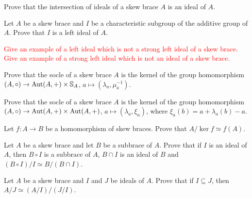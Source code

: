 \begin{prob}
\label{prob:sum_ideals}
Prove that the intersection of ideals of a skew brace $A$ is an ideal of $A$. 
\end{prob}

\begin{prob}
Let $A$ be a skew brace and $I$ be a characteristic subgroup of the additive group of $A$. Prove that
$I$ is a left ideal of $A$. 
\end{prob}


\begin{prob}\label{prob:exleftidealnotstrong}
\textcolor{red}{Give an example of a left ideal which is not a strong left ideal of a skew brace. Give an example of a strong left ideal which is not an ideal of a skew brace.} 
\end{prob}

\begin{prob}
\label{prob:Bachiller1}
Prove that the socle of a skew brace $A$ is the kernel of the 
group homomorphism $(A,\circ)\to\operatorname{Aut}(A,+)\times\mathbb{S}_A$, $a\mapsto (\lambda_a,\mu_a^{-1})$. 
\end{prob}

\begin{prob}
\label{prob:Bachiller2}
Prove that the socle of a skew brace $A$ is the kernel of the 
group homomorphism $(A,\circ)\to\operatorname{Aut}(A,+)\times\operatorname{Aut}(A,+)$, $a\mapsto (\lambda_a,\xi_a)$, where
$\xi_a(b)=a+\lambda_a(b)-a$. 
\end{prob}

\begin{prob}
\label{prob:iso1}
    Let $f\colon A\to B$ be a homomorphism of skew braces. Prove that $A/\ker f\simeq f(A)$. 
\end{prob}

\begin{prob}
\label{prob:iso2}
    Let $A$ be a skew brace and let $B$ be a subbrace of $A$. Prove that if $I$ is an ideal of $A$, 
    then $B\circ I$ is a subbrace of $A$, 
    $B\cap I$ is an ideal of $B$ and $(B\circ I)/I\simeq B/(B\cap I)$. 
\end{prob}

\begin{prob}
\label{prob:iso3}
Let $A$ be a skew brace and $I$ and $J$ be ideals of $A$. Prove that if $I\subseteq J$, then
$A/J\simeq (A/I)/(J/I)$. 
\end{prob}


